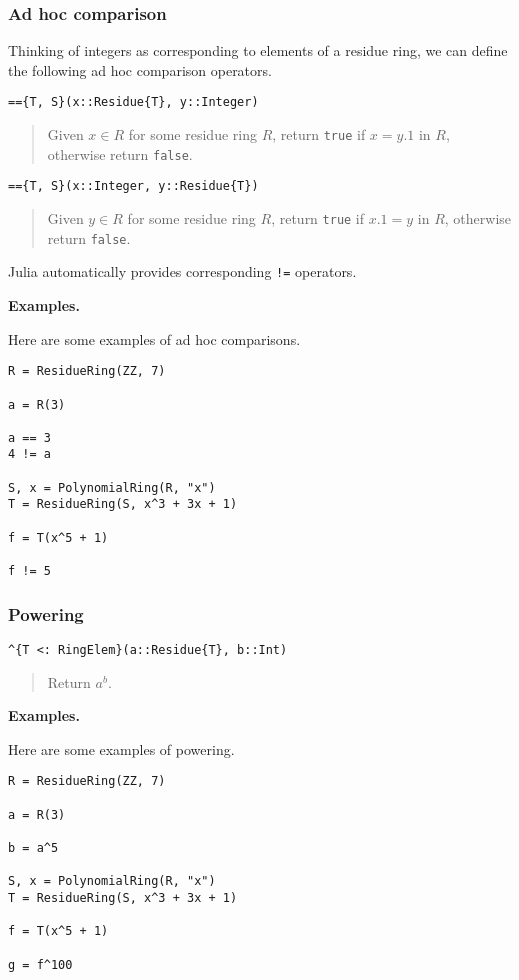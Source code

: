 \documentclass[a4paper,10pt]{article}
\newcommand{\code}{\lstinline}
\newcommand{\desc}[1]{\vspace{-3mm}\begin{quote}#1\end{quote}}
\begin{document}
\subsubsection{Ad hoc comparison}

Thinking of integers as corresponding to elements of a residue ring, we
can define the following ad hoc comparison operators.

\begin{lstlisting}
=={T, S}(x::Residue{T}, y::Integer)
\end{lstlisting}

\desc{Given $x \in R$ for some residue ring $R$, return \code{true} 
if $x = y.1$ in $R$, otherwise return \code{false}.}

\begin{lstlisting}
=={T, S}(x::Integer, y::Residue{T})
\end{lstlisting}

\desc{Given $y \in R$ for some residue ring $R$, return \code{true} 
if $x.1 = y$ in $R$, otherwise return \code{false}.}

Julia automatically provides corresponding \code{!=} operators.

\textbf{Examples.}

Here are some examples of ad hoc comparisons.

\begin{lstlisting}
R = ResidueRing(ZZ, 7)

a = R(3)

a == 3
4 != a

S, x = PolynomialRing(R, "x")
T = ResidueRing(S, x^3 + 3x + 1)

f = T(x^5 + 1)

f != 5
\end{lstlisting}

\subsubsection{Powering}

\begin{lstlisting}
^{T <: RingElem}(a::Residue{T}, b::Int)
\end{lstlisting}

\desc{Return $a^b$.}

\textbf{Examples.}

Here are some examples of powering.

\begin{lstlisting}
R = ResidueRing(ZZ, 7)

a = R(3)

b = a^5

S, x = PolynomialRing(R, "x")
T = ResidueRing(S, x^3 + 3x + 1)

f = T(x^5 + 1)

g = f^100
\end{lstlisting}
\end{document}
